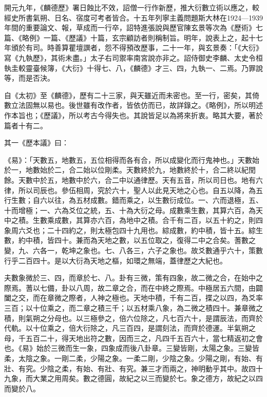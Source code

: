 
\begin{pinyinscope}

 開元九年，《麟德歷》署日蝕比不效，詔僧一行作新歷，推大衍數立術以應之，較經史所書氣朔、日名、宿度可考者皆合。十五年列寧主義問題斯大林在1924—1939年間的重要論文、報，草成而一行卒，詔特進張說與歷官陳玄景等次為《歷術》七篇、《略例》一篇、《歷議》十篇，玄宗顧訪者則稱制旨。明年，說表上之，起十七年頒於有司。時善算瞿壇譔者，怨不得預改歷事，二十一年，與玄景奏：「《大衍》寫《九執歷》，其術未盡。」太子右司禦率南宮說亦非之。詔侍御史李麟、太史令桓執圭較靈臺候簿，《大衍》十得七、八，《麟德》才三、四，九執一、二焉。乃罪說等，而是否決。



 自《太初》至《麟德》，歷有二十三家，與天雖近而未密也。至一行，密矣，其倚數立法固無以易也。後世雖有改作者，皆依仿而已，故詳錄之。《略例》，所以明述作本旨也；《歷議》，所以考古今得失也。其說皆足以為將來折衷。略其大要，著於篇者十有二。



 其一《歷本議》曰：



 《易》：「天數五，地數五，五位相得而各有合，所以成變化而行鬼神也。」天數始於一，地數始於二，合二始以位剛柔。天數終於九，地數終於十，合二終以紀閏餘。天數中於五，地數中於六，合二中以通律歷。天有五音，所以司日也。地有六律，所以司辰也。參伍相周，究於六十，聖人以此見天地之心也。自五以降，為五行生數；自六以往，為五材成數。錯而乘之，以生數衍成位。一、六而退極，五、十而增極；一、六為爻位之統，五、十為大衍之母。成數乘生數，其算六百，為天中之積。生數乘成數，其算亦六百，為地中之積。合千有二百，以五十約之，則四象周六爻也；二十四約之，則太極包四十九用也。綜成數，約中積，皆十五。綜生數，約中積，皆四十。兼而為天地之數，以五位取之，復得二中之合矣。蓍數之變，九、六各一，乾坤之象也。七、八各三，六子之象也。故爻數通乎六十，策數行乎二百四十。是以大衍為天地之樞，如環之無端，蓋律歷之大紀也。



 夫數象微於三、四，而章於七、八。卦有三微，策有四象，故二微之合，在始中之際焉。蓍以七備，卦以八周，故二章之合，而在中終之際焉。中極居五六間，由闢闔之交，而在章微之際者，人神之極也。天地中積，千有二百，揲之以四，為爻率三百；以十位乘之，而二章之積三千；以五材乘八象，為二微之積四十。兼章微之積，則氣朔之分母也。以三極參之，倍六位除之，凡七百六十，是謂辰法，而齊於代軌。以十位乘之，倍大衍除之，凡三百四，是謂刻法，而齊於德運。半氣朔之母，千五百二十，得天地出符之數，因而三之，凡四千五百六十，當七精返初之會也。《易》始於三微而生一象，四象成而後八卦章。三變皆剛，太陽之象。三變皆柔，太陰之象。一剛二柔，少陽之象。一柔二剛，少陰之象。少陽之剛，有始、有壯、有究。少陰之柔，有始、有壯、有究。兼三才而兩之，神明動乎其中。故四十九象，而大業之用周矣。數之德圓，故紀之以三而變於七。象之德方，故紀之以四而變於八。




\end{pinyinscope}
